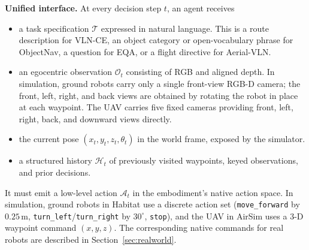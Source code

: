 \documentclass[conference]{IEEEtran}
\begin{document}
\textbf{Unified interface.} At every decision step $t$, an agent receives
\begin{itemize}
  \item a task specification $\mathcal{T}$ expressed in natural
  language.  This is a route description for
  VLN-CE, an object category or open-vocabulary phrase for
  ObjectNav, a question for EQA, or a flight directive for Aerial-VLN.
  \item an egocentric observation $\mathcal{O}_t$ consisting of RGB and
  aligned depth. In simulation, ground robots carry only a single front-view
  RGB-D camera; the front, left, right, and back views are obtained by
  rotating the robot in place at each waypoint. The
  UAV carries five fixed cameras providing front, left, right, back, and
  downward views directly.
  \item the current pose $(x_t, y_t, z_t, \theta_t)$ in the world
  frame, exposed by the simulator.
  \item a structured history $\mathcal{H}_t$ of previously visited
  waypoints, keyed observations, and prior decisions.
\end{itemize}
It must emit a low-level action $\mathcal{A}_t$ in the embodiment's native
action space. In simulation, ground robots in Habitat use a discrete action
set (\texttt{move\_forward} by $0.25$\,m,
\texttt{turn\_left}/\texttt{turn\_right} by $30^{\circ}$, \texttt{stop}), and
the UAV in AirSim uses a 3-D waypoint command $(x,y,z)$. The corresponding
native commands for real robots are described in Section~\ref{sec:realworld}.
\end{document}
